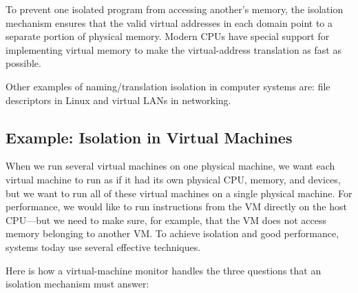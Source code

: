 \documentclass[
  letterpaper,
]{scrbook}
\theoremstyle{definition}
\theoremstyle{plain}
\theoremstyle{plain}
\theoremstyle{remark}
\begin{document}
To prevent one isolated program from accessing another's memory, the
isolation mechanism ensures that the valid virtual addresses in each
domain point to a separate portion of physical memory. Modern CPUs have
special support for implementing virtual memory to make the
virtual-address translation as fast as possible.

Other examples of naming/translation isolation in computer systems are:
file descriptors in Linux and virtual LANs in networking.

\subsection{Example: Isolation in Virtual
Machines}\label{example-isolation-in-virtual-machines}

When we run several virtual machines on one physical machine, we want
each virtual machine to run as if it had its own physical CPU, memory,
and devices, but we want to run all of these virtual machines on a
single physical machine. For performance, we would like to run
instructions from the VM directly on the host CPU---but we need to make
sure, for example, that the VM does not access memory belonging to
another VM. To achieve isolation and good performance, systems today use
several effective techniques.

Here is how a virtual-machine monitor handles the three questions that
an isolation mechanism must answer:
\end{document}
